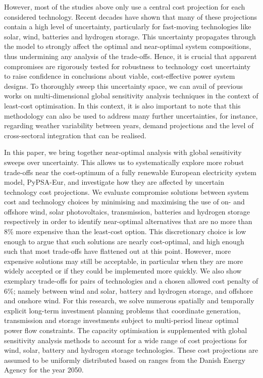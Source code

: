 However, most of the studies above only use a central cost projection for each
considered technology. Recent decades have shown that many of these projections
contain a high level of uncertainty, particularly for fast-moving technologies
like solar, wind, batteries and hydrogen storage.
\cite{ludererImpactDeclining2021,victoriaSolarPhotovoltaics2021,jaxa-rozenSourcesUncertainty2021}
This uncertainty propagates through the model to strongly affect the optimal and
near-optimal system compositions, thus undermining any analysis of the
trade-offs. Hence, it is crucial that apparent compromises are rigorously tested
for robustness to technology cost uncertainty to raise confidence in conclusions
about viable, cost-effective power system designs. To thoroughly sweep this
uncertainty space, we can avail of previous works on multi-dimensional global
sensitivity analysis techniques in the context of least-cost
optimisation.\cite{trondle_trade-offs_2020, mavromatidis_uncertainty_2018,
pizarro-alonso_uncertainties_2019, fais_impact_2016, usher_value_2015} In this
context, it is also important to note that this methodology can also be used to
address many further uncertainties, for instance, regarding weather variability
between years, demand projections and the level of cross-sectoral integration
that can be realised.


In this paper, we bring together near-optimal analysis with global sensitivity
sweeps over uncertainty. This allows us to systematically explore more robust
trade-offs near the cost-optimum of a fully renewable European electricity
system model, PyPSA-Eur,\cite{pypsaeur} and investigate how they are affected by
uncertain technology cost projections. We evaluate compromise solutions between
system cost and technology choices by minimising and maximising the use of on-
and offshore wind, solar photovoltaics, transmission, batteries and hydrogen
storage respectively in order to identify near-optimal alternatives that are no
more than 8\% more expensive than the least-cost option. This discretionary
choice is low enough to argue that such solutions are nearly cost-optimal, and
high enough such that most trade-offs have flattened out at this point. However,
more expensive solutions may still be acceptable, in particular when they are
more widely accepted or if they could be implemented more quickly. We also show
exemplary trade-offs for pairs of technologies and a chosen allowed cost penalty
of 6\%; namely between wind and solar, battery and hydrogen storage, and
offshore and onshore wind. For this research, we solve numerous spatially and
temporally explicit long-term investment planning problems that coordinate
generation, transmission and storage investments subject to multi-period linear
optimal power flow constraints. The capacity optimisation is supplemented with
global sensitivity analysis methods to account for a wide range of cost
projections for wind, solar, battery and hydrogen storage technologies. These
cost projections are assumed to be uniformly distributed based on ranges from
the Danish Energy Agency for the year 2050.\cite{DEA}

